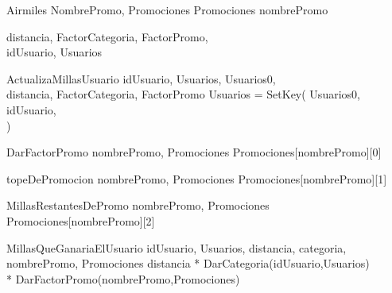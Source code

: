\documentclass[11pt,a4paper]{article}
\newcommand{\Tipo}[1]{\mathsf{#1}}
\begin{document}
\begin{tad}{Airmiles}
    \vspace{1cm}
    {\In NombrePromo, \In Promociones}
    {\Tipo{\R}}
    {Promociones \lbrack nombrePromo \rbrack {} \rbrack}

    \vspace{1cm}
    {
        \In distancia,
        \In FactorCategoria,
        \In FactorPromo,\\
        \In idUsuario,
        \In Usuarios
    }
    {\tupla{\Tipo{\Z},\Tipo{\Z}}}
    {
    }
    
    \vspace{1cm}
    \predLargo
    {ActualizaMillasUsuario}
    {
        idUsuario,
        Usuarios,
        Usuarios0, \\
        distancia,
        FactorCategoria,
        FactorPromo
    }
    {Usuarios = SetKey(
        Usuarios0,
        idUsuario, \\
        )
    }


    \vspace{1cm}
    \auxLargo
    {DarFactorPromo}
    {nombrePromo, Promociones}
    {\Tipo{\R}}
    {
        Promociones[nombrePromo][0]
    }

    \vspace{1cm}
    \auxLargo
    {topeDePromocion}
    {nombrePromo, Promociones}
    {\Tipo{\R}}
    {Promociones[nombrePromo][1]}

    \vspace{1cm}
    \auxLargo
    {MillasRestantesDePromo}
    {nombrePromo, Promociones}
    {\Tipo{\R}}
    {
        Promociones[nombrePromo][2]
    }

    

    \vspace{1cm}
    \auxLargo
    {MillasQueGanariaElUsuario}
    {idUsuario, Usuarios, distancia, categoria, \\ nombrePromo, Promociones}
    {\Tipo{\R}}
    {
        distancia * DarCategoria(idUsuario,Usuarios) \\ 
        * DarFactorPromo(nombrePromo,Promociones)
    }


\end{tad}
\end{document}

